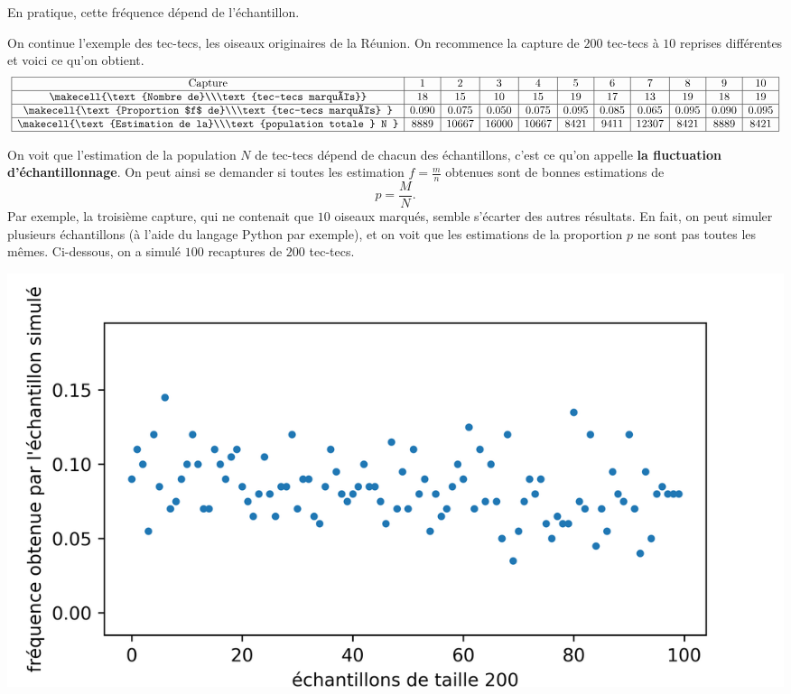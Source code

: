 \documentclass[11pt]{article}
\begin{document}
En pratique, cette fréquence dépend de l'échantillon.
\begin{exemple}
  On continue l'exemple des tec-tecs, les oiseaux originaires de la Réunion. On
  recommence la capture de $200$ tec-tecs à $10$ reprises différentes et voici
  ce qu'on obtient.
\[
  \begin{array}{|c|c|c|c|c|c|c|c|c|c|c|}
    \hline
    \text{Capture} & 1 & 2 & 3 & 4 & 5 & 6 & 7 & 8 & 9 & 10 \\
    \hline
    \makecell{\text{Nombre de}\\\text{tec-tecs marqués}} & 18 & 15 & 10 & 15 & 19 & 17 & 13 & 19 &
    18 & 19 \\
    \hline
    \makecell{\text{Proportion $f$ de}\\\text{tec-tecs marqués}
    } & 0.090  & 0.075 & 0.050 & 0.075 &
    0.095 & 0.085 & 0.065 & 0.095 & 0.090 & 0.095 \\
    \hline
    \makecell{\text{Estimation de la}\\\text{population totale } N
    } & 8889  & 10667 & 16000 & 10667 &
    8421 & 9411 & 12307 & 8421 & 8889 & 8421\\
    \hline
  \end{array}
\]
\end{exemple}
\noindent On voit que l'estimation de la population $N$ de tec-tecs dépend de chacun des
échantillons, c'est ce qu'on appelle \textbf{la fluctuation d'échantillonnage}.
On peut ainsi se demander si toutes les estimation $f=\frac{m}{n}$ obtenues sont
de bonnes estimations de
\[
  p = \frac{M}{N}.
\]
Par exemple, la troisième capture, qui ne contenait que $10$ oiseaux marqués,
semble s'écarter des autres résultats. En fait, on peut simuler plusieurs
échantillons (à l'aide du langage Python par exemple), et on voit que les
estimations de la proportion $p$ ne sont pas toutes les mêmes. Ci-dessous, on a
simulé $100$ recaptures de $200$ tec-tecs.
\begin{center}
\includegraphics{simul200.png}
\end{center}
\end{document}
